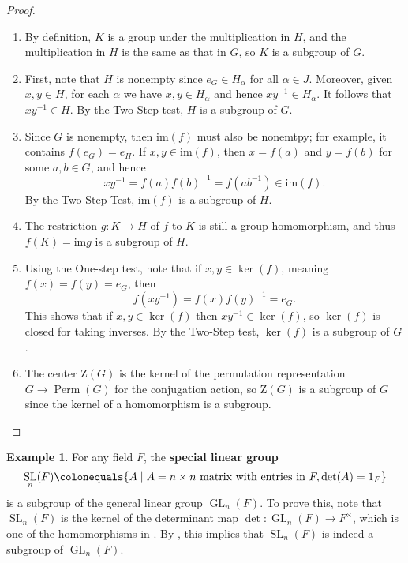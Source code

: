 \documentclass[12pt]{report}
\numberwithin{equation}{section}
\numberwithin{theorem}{chapter}
\theoremstyle{definition}
\newtheorem{example}[theorem]{Example}
\newtheorem*{basic properties}{Basic Properties}
\newtheorem*{Important Remark}{Important Remark}
\newcommand{\df}[1]{{\bf #1}\index{#1}}
\DeclareMathOperator{\GL}{GL}
\DeclareMathOperator{\SL}{SL}
\DeclareMathOperator{\Perm}{Perm}
\renewcommand{\ker}{\operatorname{ker}}
\begin{document}
\begin{proof}$\,$

\vspace{-0.6em}
\begin{enumerate}[itemsep=-0.1em,label=(\alph*)]
	\item By definition, $K$ is a group under the multiplication in $H$, and the multiplication in $H$ is the same as that in $G$, so $K$ is a subgroup of $G$.
	\item First, note that $H$ is nonempty since $e_G \in H_\alpha$ for all $\alpha\in J$. Moreover, given $x,y\in H$, for each $\alpha$ we have $x,y \in H_\alpha$ and hence $xy^{-1} \in H_\alpha$. It follows that $xy^{-1} \in H$. By the Two-Step test, $H$ is a subgroup of $G$. 
	\item Since $G$ is nonempty, then $\mathrm{im}(f)$ must also be nonemtpy; for example, it contains $f(e_G) = e_H$. If $x,y \in \mathrm{im}(f)$, then $x = f(a)$ and $y = f(b)$ for some $a,b \in G$, and hence 
	$$xy^{-1} =f(a)f(b)^{-1} = f(ab^{-1}) \in \mathrm{im}(f).$$
	By the Two-Step Test, $\mathrm{im}(f)$ is a subgroup of $H$. 
	
	\item The restriction $g\!: K \to H$ of $f$ to $K$ is still a group homomorphism, and thus $f(K) = \mathrm{im} g$ is a subgroup of $H$. 
	
	\item Using the One-step test, note that if $x, y \in \ker(f)$, meaning $f(x)=f(y)=e_G$, then 
	$$f(xy^{-1})=f(x)f(y)^{-1}=e_G.$$ 
	This shows that if $x,y\in \ker(f)$ then $xy^{-1}\in \ker(f)$, so $\ker(f)$ is closed for taking inverses. By the Two-Step test, $\ker(f)$ is a subgroup of $G$.
	\item The center $\mathrm{Z}(G)$ is the kernel of the permutation representation $G\to \Perm(G)$ for the conjugation action, so $\mathrm{Z}(G)$ is a subgroup of $G$ since the kernel of a homomorphism is a subgroup.\qedhere 
\end{enumerate} 
\end{proof}




\begin{example}
For any field $F$, the \df{special linear group}
$$\SL_n(F) \colonequals \{A \mid A = n\times n \text{ matrix with entries in } F, \det(A)=1_F\}$$
is a subgroup of the general linear group $\GL_n(F)$. To prove this, note that $\SL_n(F)$ is the kernel of the determinant map $\det\!:\GL_n(F)\to F^\times$, which is one of the homomorphisms in . By , this implies that $\SL_n(F)$ is indeed a subgroup of $\GL_n(F)$.
\end{example}
\end{document}
